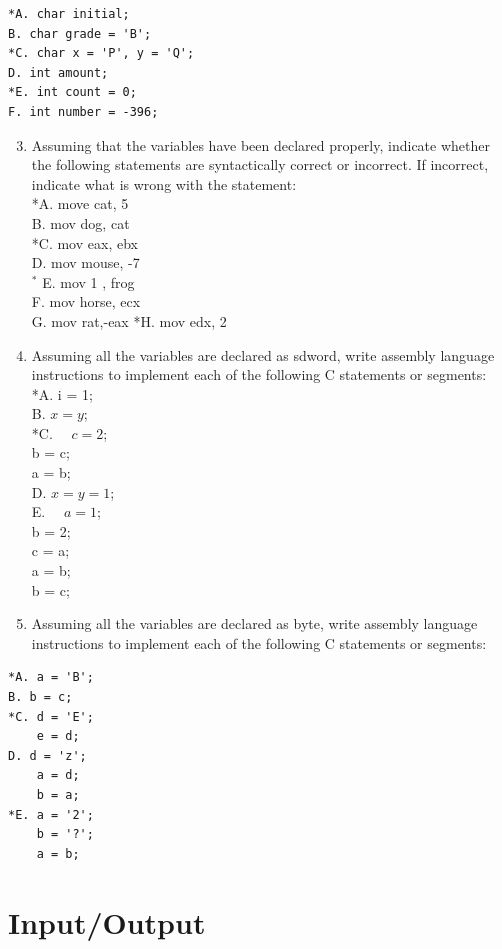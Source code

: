 \documentclass[10pt]{article}
\begin{document}
\begin{verbatim}
*A. char initial;
B. char grade = 'B';
*C. char x = 'P', y = 'Q';
D. int amount;
*E. int count = 0;
F. int number = -396;
\end{verbatim}

\begin{enumerate}
  \setcounter{enumi}{2}
  \item Assuming that the variables have been declared properly, indicate whether the following statements are syntactically correct or incorrect. If incorrect, indicate what is wrong with the statement:\\
*A. move cat, 5\\
B. mov dog, cat\\
*C. mov eax, ebx\\
D. mov mouse, -7\\
${ }^{*}$ E. mov 1 , frog\\
F. mov horse, ecx\\
G. mov rat,-eax *H. mov edx, 2
  \item Assuming all the variables are declared as sdword, write assembly language instructions to implement each of the following C statements or segments:\\
*A. i = 1;\\
B. $x=y$;\\
*C. $\quad c=2$;\\
b = c;\\
a = b;\\
D. $x=y=1$;\\
E. $\quad a=1$;\\
b = 2;\\
c = a;\\
a = b;\\
b = c;
  \item Assuming all the variables are declared as byte, write assembly language instructions to implement each of the following C statements or segments:
\end{enumerate}

\begin{verbatim}
*A. a = 'B';
B. b = c;
*C. d = 'E';
    e = d;
D. d = 'z';
    a = d;
    b = a;
*E. a = '2';
    b = '?';
    a = b;
\end{verbatim}

\section*{Input/Output}
\end{document}
